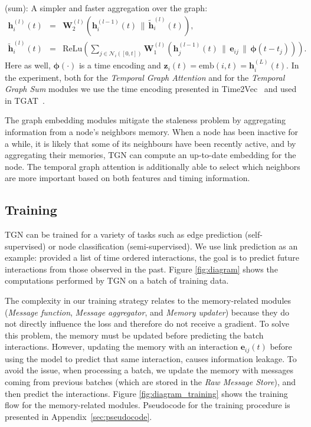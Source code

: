 \documentclass{article}
\begin{document}
 (sum):
 A simpler and faster aggregation over the graph:
\begin{eqnarray}
    \mathbf{h}^{(l)}_i(t) &=& \mathbf{W}_2^{(l)}(\mathbf{h}^{(l-1)}_i(t) \, \| \, \tilde{\mathbf{h}}^{(l)}_i(t)),\\
    \tilde{\mathbf{h}}^{(l)}_i(t) &=& \mathrm{ReLu} (\sum_{j  \in \mathcal{N}_i([0, t]) } \mathbf{W}_1^{(l)}(\mathbf{h}^{(l-1)}_j(t) \, \|\, \mathbf{e}_{ij} \, \|\, \boldsymbol{\phi}(t - t_{j}))).
\end{eqnarray}
%
Here as well, $\boldsymbol{\phi}(\cdot)$ is a time encoding and $\mathbf{z}_i(t) = \mathrm{emb}(i, t) = \mathbf{h}_i^{(L)}(t)$. In the experiment, both for the \textit{Temporal Graph Attention} and for the \textit{Temporal Graph Sum} modules we use the time encoding presented in Time2Vec~\citep{DBLP:journals/corr/abs-1907-05321} and used in TGAT~\citep{Xu2020Inductive}.

The graph embedding modules mitigate the staleness problem by aggregating information from a node's neighbors memory. When a node has been inactive for a while, it is likely that some of its neighbours have been recently active, and by aggregating their memories, TGN can compute an up-to-date embedding for the node. The temporal graph attention is additionally able to select which neighbors are more important based on both features and timing information.

\subsection{Training} \label{sec:training}

TGN can be trained for a variety of tasks such as edge prediction (self-supervised) or node classification (semi-supervised). We use  link prediction  as an example: provided a list of time ordered interactions, the goal is to predict future interactions from those observed in the past. Figure \ref{fig:diagram} shows the computations performed by TGN on a batch of training data. 

The complexity in our training strategy relates to the memory-related modules (\textit{Message function}, \textit{Message aggregator}, and \textit{Memory updater}) because they do not directly influence the loss and therefore do not receive a gradient. To solve this problem, the memory must be updated before predicting the batch interactions. However, updating the memory with an interaction $\mathbf{e}_{ij}(t)$ before using the model to predict that same interaction, causes information leakage. %
To avoid the issue, when processing a batch, we update the memory with messages coming from previous batches (which are stored in the \textit{Raw Message Store}), and then predict the interactions. Figure \ref{fig:diagram_training} shows the training flow for the memory-related modules. Pseudocode for the training procedure is presented in Appendix~\ref{sec:pseudocode}. 
\end{document}
